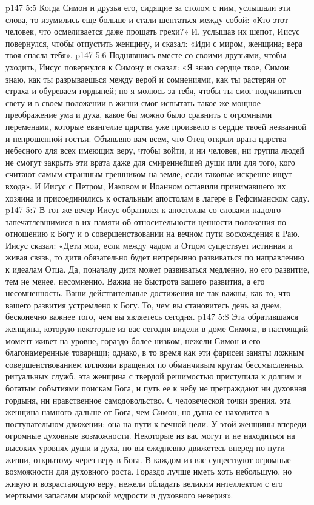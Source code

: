 \vs p147 5:5 \pc Когда Симон и друзья его, сидящие за столом с ним, услышали эти слова, то изумились еще больше и стали шептаться между собой: «Кто этот человек, что осмеливается даже прощать грехи?» И, услышав их шепот, Иисус повернулся, чтобы отпустить женщину, и сказал: «Иди с миром, женщина; вера твоя спасла тебя».
\vs p147 5:6 Поднявшись вместе со своими друзьями, чтобы уходить, Иисус повернулся к Симону и сказал: «Я знаю сердце твое, Симон; знаю, как ты разрываешься между верой и сомнениями, как ты растерян от страха и обуреваем гордыней; но я молюсь за тебя, чтобы ты смог подчиниться свету и в своем положении в жизни смог испытать такое же мощное преображение ума и духа, какое бы можно было сравнить с огромными переменами, которые евангелие царства уже произвело в сердце твоей незванной и непрошенной гостьи. Объявляю вам всем, что Отец открыл врата царства небесного для всех имеющих веру, чтобы войти, и ни человек, ни группа людей не смогут закрыть эти врата даже для смиреннейшей души или для того, кого считают самым страшным грешником на земле, если таковые искренне ищут входа». И Иисус с Петром, Иаковом и Иоанном оставили принимавшего их хозяина и присоединились к остальным апостолам в лагере в Гефсиманском саду.
\vs p147 5:7 \pc В тот же вечер Иисус обратился к апостолам со словами надолго запечатлевшимися в их памяти об относительности ценности положения по отношению к Богу и о совершенствовании на вечном пути восхождения к Раю. Иисус сказал: «Дети мои, если между чадом и Отцом существует истинная и живая связь, то дитя обязательно будет непрерывно развиваться по направлению к идеалам Отца. Да, поначалу дитя может развиваться медленно, но его развитие, тем не менее, несомненно. Важна не быстрота вашего развития, а его несомненность. Ваши действительные достижения не так важны, как то, что  вашего развития устремлено к Богу. То, чем вы становитесь день за днем, бесконечно важнее того, чем вы являетесь сегодня.
\vs p147 5:8 Эта обратившаяся женщина, которую некоторые из вас сегодня видели в доме Симона, в настоящий момент живет на уровне, гораздо более низком, нежели Симон и его благонамеренные товарищи; однако, в то время как эти фарисеи заняты ложным совершенствованием иллюзии вращения по обманчивым кругам бессмысленных ритуальных служб, эта женщина с твердой решимостью приступила к долгим и богатым событиями поискам Бога, и путь ее к небу не преграждают ни духовная гордыня, ни нравственное самодовольство. С человеческой точки зрения, эта женщина намного дальше от Бога, чем Симон, но душа ее находится в поступательном движении; она на пути к вечной цели. У этой женщины впереди огромные духовные возможности. Некоторые из вас могут и не находиться на высоких уровнях души и духа, но вы ежедневно движетесь вперед по пути жизни, открытому через веру в Бога. В каждом из вас существуют огромные возможности для духовного роста. Гораздо лучше иметь хоть небольшую, но живую и возрастающую веру, нежели обладать великим интеллектом с его мертвыми запасами мирской мудрости и духовного неверия».
